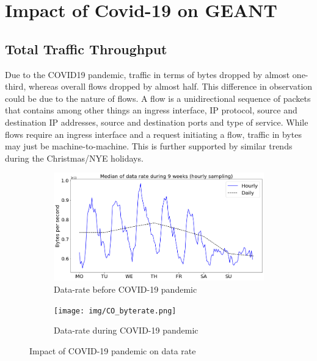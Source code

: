 \documentclass[10pt, journal, letterpaper]{IEEEtran}
\newcommand\linearFigSze{0.48}
\begin{document}
\section{Impact of Covid-19 on GEANT}

\subsection{Total Traffic Throughput}
Due to the COVID19 pandemic, traffic in terms of bytes dropped by almost one-third, whereas overall flows dropped by almost half. This difference in observation could be due to the nature of flows. A flow is a unidirectional sequence of packets that contains among other things an ingress interface, IP protocol, source and destination IP addresses, source and destination ports and type of service. While flows require an ingress interface and a request initiating a flow, traffic in bytes may just be machine-to-machine. This is further supported by similar trends during the Christmas/NYE holidays.

\begin{figure}
    \begin{subfigure}{\linearFigSze\textwidth}
          \centering
          \includegraphics[width=\columnwidth]{img/BCO_byterate.png}
          \caption{Data-rate before COVID-19 pandemic}
          \label{fig:BCO_bps}
    \end{subfigure}
    \begin{subfigure}{\linearFigSze\textwidth}
          \centering
          \texttt{[image: img/CO\_byterate.png]}
          \caption{Data-rate during COVID-19 pandemic}
          \label{fig:CO_bps}
    \end{subfigure}
    \caption{Impact of COVID-19 pandemic on data rate}
    \label{fig:datarate_BCO_CO}
\end{figure}
\end{document}
